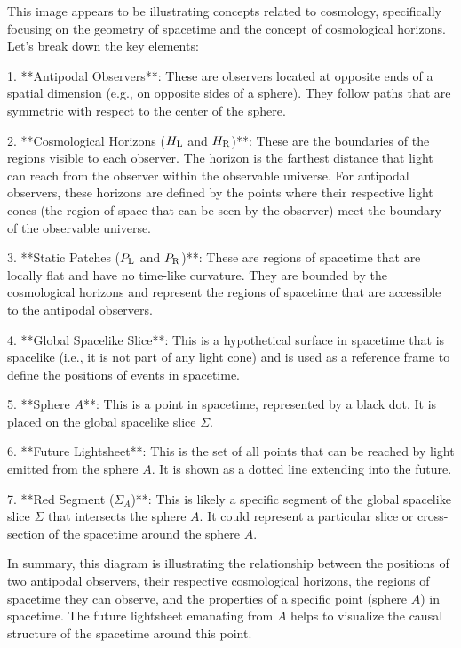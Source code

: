 This image appears to be illustrating concepts related to cosmology, specifically focusing on the geometry of spacetime and the concept of cosmological horizons. Let's break down the key elements:

1. **Antipodal Observers**: These are observers located at opposite ends of a spatial dimension (e.g., on opposite sides of a sphere). They follow paths that are symmetric with respect to the center of the sphere.

2. **Cosmological Horizons ($H_{\rm L}$ and $H_{\rm R}$)**: These are the boundaries of the regions visible to each observer. The horizon is the farthest distance that light can reach from the observer within the observable universe. For antipodal observers, these horizons are defined by the points where their respective light cones (the region of space that can be seen by the observer) meet the boundary of the observable universe.

3. **Static Patches ($P_{\rm L}$ and $P_{\rm R}$)**: These are regions of spacetime that are locally flat and have no time-like curvature. They are bounded by the cosmological horizons and represent the regions of spacetime that are accessible to the antipodal observers.

4. **Global Spacelike Slice**: This is a hypothetical surface in spacetime that is spacelike (i.e., it is not part of any light cone) and is used as a reference frame to define the positions of events in spacetime.

5. **Sphere $A$**: This is a point in spacetime, represented by a black dot. It is placed on the global spacelike slice $\Sigma$.

6. **Future Lightsheet**: This is the set of all points that can be reached by light emitted from the sphere $A$. It is shown as a dotted line extending into the future.

7. **Red Segment ($\Sigma_A$)**: This is likely a specific segment of the global spacelike slice $\Sigma$ that intersects the sphere $A$. It could represent a particular slice or cross-section of the spacetime around the sphere $A$.

In summary, this diagram is illustrating the relationship between the positions of two antipodal observers, their respective cosmological horizons, the regions of spacetime they can observe, and the properties of a specific point (sphere $A$) in spacetime. The future lightsheet emanating from $A$ helps to visualize the causal structure of the spacetime around this point.